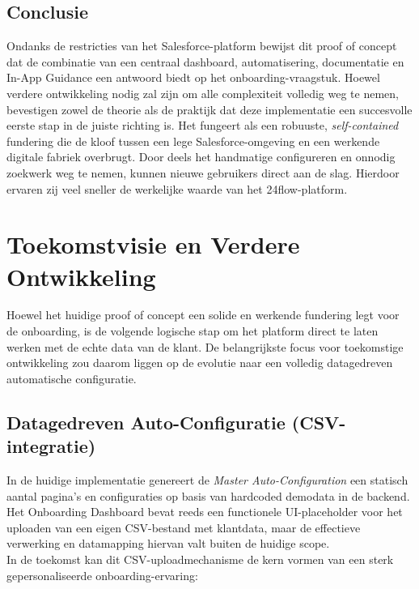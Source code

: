 \subsection{Conclusie}
Ondanks de restricties van het Salesforce-platform bewijst dit proof of concept dat de combinatie van een centraal dashboard, automatisering, documentatie en In-App Guidance een antwoord biedt op het onboarding-vraagstuk. Hoewel verdere ontwikkeling nodig zal zijn om alle complexiteit volledig weg te nemen, bevestigen zowel de theorie als de praktijk dat deze implementatie een succesvolle eerste stap in de juiste richting is. Het fungeert als een robuuste, \textit{self-contained} fundering die de kloof tussen een lege Salesforce-omgeving en een werkende digitale fabriek overbrugt. Door deels het handmatige configureren en onnodig zoekwerk weg te nemen, kunnen nieuwe gebruikers direct aan de slag. Hierdoor ervaren zij veel sneller de werkelijke waarde van het 24flow-platform.

\section{Toekomstvisie en Verdere Ontwikkeling}
\label{sec:toekomstvisie}

Hoewel het huidige proof of concept een solide en werkende fundering legt voor de onboarding, is de volgende logische stap om het platform direct te laten werken met de echte data van de klant. De belangrijkste focus voor toekomstige ontwikkeling zou daarom liggen op de evolutie naar een volledig datagedreven automatische configuratie.

\subsection{Datagedreven Auto-Configuratie (CSV-integratie)}
\label{subsec:datagedreven_autoconfiguratie}

In de huidige implementatie genereert de \textit{Master Auto-Configuration} een statisch aantal pagina's en configuraties op basis van hardcoded demodata in de backend. Het Onboarding Dashboard bevat reeds een functionele UI-placeholder voor het uploaden van een eigen CSV-bestand met klantdata, maar de effectieve verwerking en datamapping hiervan valt buiten de huidige scope.
\\

In de toekomst kan dit CSV-uploadmechanisme de kern vormen van een sterk gepersonaliseerde onboarding-ervaring:

